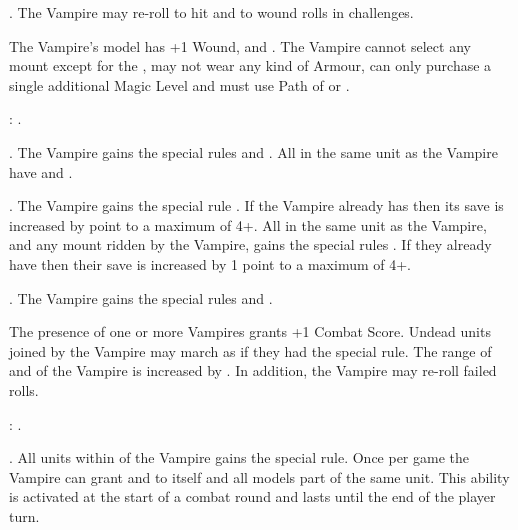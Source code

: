  \textbf{\bloodlinepower}. The Vampire may re-roll to hit and to
wound rolls in challenges.

\endpricelist

\separator


The Vampire's model has +1 Wound,  and \hatred{}. The Vampire cannot select any mount except for the \shriekinghorror{}, may not wear any kind of Armour, can only purchase a single additional Magic Level and must use Path of \wilderness{} or \necromancy{}.

\bloodties{}: \ghouls{}.

\startpricelist

 \textbf{\ancientbloodpower}. The Vampire gains the special rules \poisonedattacks and . All \ghouls{} in the same unit as the Vampire have \hatred{} and
.

 \textbf{\bloodlinepower}. The Vampire gains the special rule
. If the Vampire already has \regeneration{} then its save is increased by  point to a maximum of 4+. All \ghouls{} in the same unit as the Vampire, and any mount ridden by the Vampire, gains the special rules . If they already have \regeneration{} then their save is increased by 1 point to a maximum of 4+.

 \textbf{\bloodlinepower}. The Vampire gains the special rules \thunderouscharge{} and .

\endpricelist

\separator


The presence of one or more \vonkarnstein{} Vampires grants +1 Combat Score. Undead units joined by the Vampire may march as if they had the \vampiric{} special rule. The range of \inspiringpresence{} and \holdyourground{} of the Vampire is increased by . In addition, the Vampire may re-roll failed \vampiric{} rolls.

\bloodties{}: \darkcoach .

\startpricelist

 \textbf{\ancientbloodpower}. All units within  of the Vampire gains the \blurry{} special rule. Once per game the Vampire can grant \lightningattacks{} and  to itself and all models part of the same unit. This ability is activated at the start of a combat round and lasts until the end of the player turn.

